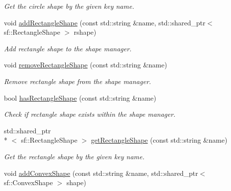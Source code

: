 \begin{DoxyCompactItemize}
\begin{DoxyCompactList}\small\item\em Get the circle shape by the given key name. \end{DoxyCompactList}\item 
\hypertarget{class_shape_manager_a35bc658017d6f80e71edef1db1525021}{void \hyperlink{class_shape_manager_a35bc658017d6f80e71edef1db1525021}{add\-Rectangle\-Shape} (const std\-::string \&name, std\-::shared\-\_\-ptr$<$ sf\-::\-Rectangle\-Shape $>$ rshape)}\label{d0/d65/class_shape_manager_a35bc658017d6f80e71edef1db1525021}

\begin{DoxyCompactList}\small\item\em Add rectangle shape to the shape manager. \end{DoxyCompactList}\item 
\hypertarget{class_shape_manager_a35e44d8151f822afb1f3cc685f98411e}{void \hyperlink{class_shape_manager_a35e44d8151f822afb1f3cc685f98411e}{remove\-Rectangle\-Shape} (const std\-::string \&name)}\label{d0/d65/class_shape_manager_a35e44d8151f822afb1f3cc685f98411e}

\begin{DoxyCompactList}\small\item\em Remove rectangle shape from the shape manager. \end{DoxyCompactList}\item 
\hypertarget{class_shape_manager_a335c932087dc017647046d2212e048b3}{bool \hyperlink{class_shape_manager_a335c932087dc017647046d2212e048b3}{has\-Rectangle\-Shape} (const std\-::string \&name)}\label{d0/d65/class_shape_manager_a335c932087dc017647046d2212e048b3}

\begin{DoxyCompactList}\small\item\em Check if rectangle shape exists within the shape manager. \end{DoxyCompactList}\item 
\hypertarget{class_shape_manager_ae6db2abfe598532e3a04634377958bab}{std\-::shared\-\_\-ptr\\*
$<$ sf\-::\-Rectangle\-Shape $>$ \hyperlink{class_shape_manager_ae6db2abfe598532e3a04634377958bab}{get\-Rectangle\-Shape} (const std\-::string \&name)}\label{d0/d65/class_shape_manager_ae6db2abfe598532e3a04634377958bab}

\begin{DoxyCompactList}\small\item\em Get the rectangle shape by the given key name. \end{DoxyCompactList}\item 
\hypertarget{class_shape_manager_abe0254e5863a3a3f57ee5360b2688a2d}{void \hyperlink{class_shape_manager_abe0254e5863a3a3f57ee5360b2688a2d}{add\-Convex\-Shape} (const std\-::string \&name, std\-::shared\-\_\-ptr$<$ sf\-::\-Convex\-Shape $>$ shape)}\label{d0/d65/class_shape_manager_abe0254e5863a3a3f57ee5360b2688a2d}


\end{DoxyCompactItemize}
